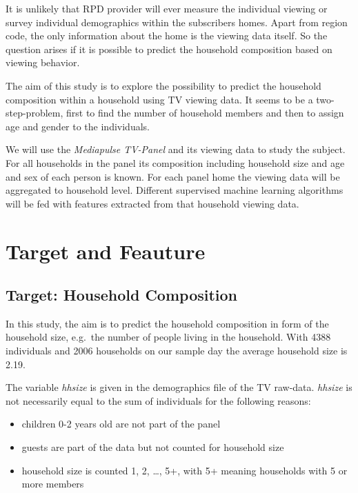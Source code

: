 \documentclass[]{article}
\providecommand{\tightlist}{%
  \setlength{\itemsep}{0pt}\setlength{\parskip}{0pt}}
\begin{document}
It is unlikely that RPD provider will ever measure the individual
viewing or survey individual demographics within the subscribers homes.
Apart from region code, the only information about the home is the
viewing data itself. So the question arises if it is possible to predict
the household composition based on viewing behavior.

The aim of this study is to explore the possibility to predict the
household composition within a household using TV viewing data. It seems
to be a two-step-problem, first to find the number of household members
and then to assign age and gender to the individuals.

We will use the \emph{Mediapulse TV-Panel} and its viewing data to study
the subject. For all households in the panel its composition including
household size and age and sex of each person is known. For each panel
home the viewing data will be aggregated to household level. Different
supervised machine learning algorithms will be fed with features
extracted from that household viewing data.

\hypertarget{target-and-feauture}{%
\section{Target and Feauture}\label{target-and-feauture}}

\hypertarget{target-household-composition}{%
\subsection{Target: Household
Composition}\label{target-household-composition}}

In this study, the aim is to predict the household composition in form
of the household size, e.g.~the number of people living in the
household. With 4388 individuals and 2006 households on our sample day
the average household size is 2.19.

The variable \emph{hhsize} is given in the demographics file of the TV
raw-data. \emph{hhsize} is not necessarily equal to the sum of
individuals for the following reasons:

\begin{itemize}
\tightlist
\item
  children 0-2 years old are not part of the panel
\item
  guests are part of the data but not counted for household size
\item
  household size is counted 1, 2, \ldots{}, 5+, with 5+ meaning
  households with 5 or more members
\end{itemize}
\end{document}
